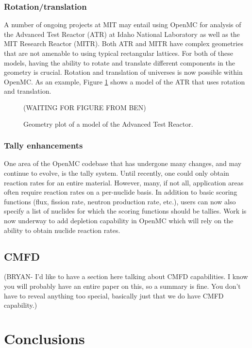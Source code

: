\documentclass{ansconf}
\begin{document}
\subsubsection{Rotation/translation}

A number of ongoing projects at MIT may entail using OpenMC for analysis of the
Advanced Test Reactor (ATR) at Idaho National Laboratory as well as the MIT
Research Reactor (MITR). Both ATR and MITR have complex geometries that are not
amenable to using typical rectangular lattices. For both of these models, having
the ability to rotate and translate different components in the geometry is
crucial. Rotation and translation of universes is now possible within OpenMC. As
an example, Figure \ref{fig:atr} shows a model of the ATR that uses rotation and
translation.

\begin{figure}[!htb]
  \centering
  (WAITING FOR FIGURE FROM BEN) %
  \caption{Geometry plot of a model of the Advanced Test Reactor.}
  \label{fig:atr}
\end{figure}  

\subsubsection{Tally enhancements} 

One area of the OpenMC codebase that has undergone many changes, and may
continue to evolve, is the tally system. Until recently, one could only obtain
reaction rates for an entire material. However, many, if not all, application
areas often require reaction rates on a per-nuclide basis. In addition to basic
scoring functions (flux, fission rate, neutron production rate, etc.), users can
now also specify a list of nuclides for which the scoring functions should be
tallies. Work is now underway to add depletion capability in OpenMC which will
rely on the ability to obtain nuclide reaction rates.

\subsection{CMFD}

(BRYAN- I'd like to have a section here talking about CMFD capabilities. I know
you will probably have an entire paper on this, so a summary is fine. You don't
have to reveal anything too special, basically just that we do have CMFD
capability.)

\section{Conclusions}
\end{document}
